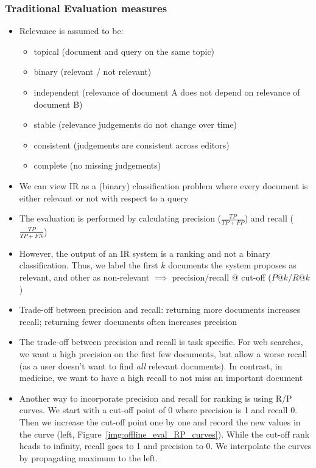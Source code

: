 \subsubsection{Traditional Evaluation measures}
\begin{itemize}
	\item Relevance is assumed to be:
	\begin{itemize}
		\item topical (document and query on the same topic)
		\item binary (relevant / not relevant)
		\item independent (relevance of document A does not depend on relevance of document B)
		\item stable (relevance judgements do not change over time)
		\item consistent (judgements are consistent across editors)
		\item complete (no missing judgements)
	\end{itemize}
	\item We can view IR as a (binary) classification problem where every document is either relevant or not with respect to a query
	\item The evaluation is performed by calculating precision ($\frac{TP}{TP+FP}$) and recall ($\frac{TP}{TP+FN}$)
	\item However, the output of an IR system is a ranking and not a binary classification. Thus, we label the first $k$ documents the system proposes as relevant, and other as non-relevant $\implies$ precision/recall $@$ cut-off ($P@k$/$R@k$)
	\item Trade-off between precision and recall: returning more documents increases recall; returning fewer documents often increases precision
	\item The trade-off between precision and recall is task specific. For web searches, we want a high precision on the first few documents, but allow a worse recall (as a user doesn't want to find \textit{all} relevant documents). In contrast, in medicine, we want to have a high recall to not miss an important document
	\item Another way to incorporate precision and recall for ranking is using R/P curves. We start with a cut-off point of 0 where precision is 1 and recall 0. Then we increase the cut-off point one by one and record the new values in the curve (left, Figure~\ref{img:offline_eval_RP_curves}). While the cut-off rank heads to infinity, recall goes to 1 and precision to 0. We interpolate the curves by propagating maximum to the left.

\end{itemize}
